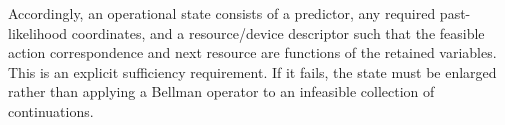 Accordingly, an operational state consists of a predictor, any required past-likelihood coordinates, and a resource/device descriptor such that the feasible action correspondence and next resource are functions of the retained variables. This is an explicit sufficiency requirement. If it fails, the state must be enlarged rather than applying a Bellman operator to an infeasible collection of continuations.
\par

